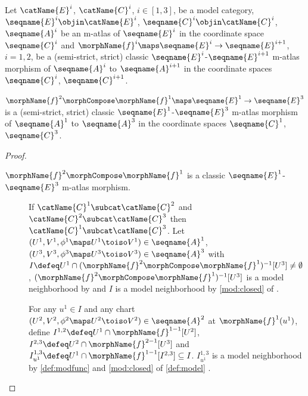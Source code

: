 \documentclass{article}
\begin{document}
\begin{lemma}
\label{lem:M-ATLcmorphcomp}
Let $\catName{E}^i$, $\catName{C}^i$, $i \in [1,3]$, be a model
category,
$\seqname{E}^i \objin \catName{E}^i$,
$\seqname{C}^i \objin \catName{C}^i$, $\seqname{A}^i$ be an m-atlas
of $\seqname{E}^i$ in the coordinate space $\seqname{C}^i$ and
$\morphName{f}^i \maps \seqname{E}^i \to \seqname{E}^{i+1}$, $i=1,2$, be
a (semi-strict, strict) classic $\seqname{E}^i$-$\seqname{E}^{i+1}$
m-atlas morphism of $\seqname{A}^i$ to $\seqname{A}^{i+1}$ in the
coordinate spaces $\seqname{C}^i$, $\seqname{C}^{i+1}$.

$
  \morphName{f}^2 \morphCompose \morphName{f}^1
  \maps \seqname{E}^1 \to \seqname{E}^3
$
is a (semi-strict, strict) classic $\seqname{E}^1$-$\seqname{E}^3$
m-atlas morphism of $\seqname{A}^1$ to $\seqname{A}^3$ in the coordinate
spaces $\seqname{C}^1$, $\seqname{C}^3$.

\begin{proof}
\leavevmode
\begin{description}
\item[\ensuremath{\morphName{f}^2 \morphCompose \morphName{f}^1} is a classic $\seqname{E}^1$-$\seqname{E}^3$ m-atlas morphism.]
If $\catName{C}^1 \subcat \catName{C}^2$ and
$\catName{C}^2 \subcat \catName{C}^3$ then
$\catName{C}^1 \subcat \catName{C}^3$.
Let
$(U^1, V^1, \phi^1 \maps U^1 \toiso V^1) \in \seqname{A}^1$,
$(U^3 ,V^3, \phi^3 \maps U^3 \toiso V^3) \in \seqname{A}^3$
with
$
  I \defeq
  U^1 \cap (\morphName{f}^2 \morphCompose \morphName{f}^1)^{-1}[U^3]
  \neq \emptyset
$,
$(\morphName{f}^2 \morphCompose \morphName{f}^1)^{-1}[U^3]$ is a model
neighborhood by  and
$I$ is a model neighborhood by \cref{mod:closed} of
{
  \showlabelsinline
}.

For any $u^1 \in I$ and any chart
$(U^2 ,V^2, \phi^2 \maps U^2 \toiso V^2) \in \seqname{A}^2$ at
$\morphName{f}^1(u^1)$, define
$I^{1,2} \defeq U^1 \cap \morphName{f}^{1-1}[U^2]$,
$I^{2,3} \defeq U^2 \cap \morphName{f}^{2-1}[U^3]$ and
$I^{1,3}_{u^1} \defeq U^1 \cap \morphName{f}^{1-1}[I^{2,3}] \subseteq I$.
$I^{1,3}_{u^1}$ is a model neighborhood by
{
  \showlabelsinline
  \cref{def:modfunc}
}
 and
\cref{mod:closed} of
{
  \showlabelsinline
  \cref{def:model}
}.


\end{description}
\end{proof}
\end{lemma}
\end{document}
